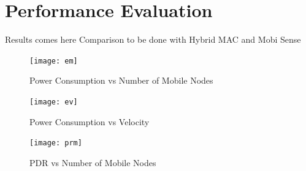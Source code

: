 \documentclass[a4paper, conference, 10pt]{IEEEtran}
\begin{document}

\section{Performance Evaluation}         
\label{sim}


Results comes here
Comparison to be done with Hybrid MAC and Mobi Sense

\begin{figure}[h]{} 
	\label{fig:em}
  \begin{center}
		\texttt{[image: em]}
  \end{center}
	\caption{Power Consumption vs Number of Mobile Nodes}
\end{figure}

\begin{figure}[h]{} 
	\label{fig:ev}
  \begin{center}
		\texttt{[image: ev]}
  \end{center}
	\caption{Power Consumption vs Velocity}
\end{figure}



\begin{figure}[h]{} 
	\label{fig:prm}
  \begin{center}
    \texttt{[image: prm]}
  \end{center}
	\caption{PDR vs Number of Mobile Nodes}
\end{figure}
\end{document}
